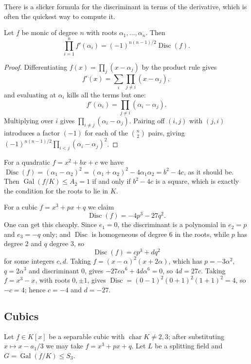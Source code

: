 \documentclass[a4paper]{scrartcl}
\newcommand{\charr}{\operatorname{char}}
\newcommand{\Gal}{\operatorname{Gal}}
\newcommand{\Disc}{\operatorname{Disc}}
\begin{document}
There is a slicker formula for the discriminant in terms of the derivative, which is often the quickest way to compute it.

\begin{proposition}\label{prop:discderiv}
	Let $f$ be monic of degree $n$ with roots $\alpha_1,\dots,\alpha_n$. Then
	$$\prod_{i=1}^n f'(\alpha_i) = (-1)^{n(n-1)/2}\Disc(f).$$
\end{proposition}

\begin{proof}
	Differentiating $f(x) = \prod_j (x-\alpha_j)$ by the product rule gives
	$$f'(x) = \sum_i \prod_{j\neq i}(x-\alpha_j),$$
	and evaluating at $\alpha_i$ kills all the terms but one:
	$$f'(\alpha_i) = \prod_{j \neq i}(\alpha_i - \alpha_j).$$
	Multiplying over $i$ gives $\prod_{i\neq j}(\alpha_i-\alpha_j)$. Pairing off $(i,j)$ with $(j,i)$ introduces a factor $(-1)$ for each of the $\binom{n}{2}$ pairs, giving $(-1)^{n(n-1)/2}\prod_{i<j}(\alpha_i-\alpha_j)^2$.
\end{proof}

\begin{example}
	For a quadratic $f = x^2+bx+c$ we have $\Disc(f) = (\alpha_1-\alpha_2)^2 = (\alpha_1+\alpha_2)^2 - 4\alpha_1\alpha_2 = b^2-4c$, as it should be. Then $\Gal(f/K) \leq A_2 = 1$ if and only if $b^2-4c$ is a square, which is exactly the condition for the roots to lie in $K$.
\end{example}

\begin{example}\label{ex:disccubic}
	For a cubic $f = x^3 + px + q$ we claim
	$$\Disc(f) = -4p^3 - 27q^2.$$
	One can get this cheaply. Since $e_1 = 0$, the discriminant is a polynomial in $e_2 = p$ and $e_3 = -q$ only; and $\Disc$ is homogeneous of degree $6$ in the roots, while $p$ has degree $2$ and $q$ degree $3$, so
	$$\Disc(f) = cp^3 + dq^2$$
	for some integers $c,d$. Taking $f = (x-\alpha)^2(x+2\alpha)$, which has $p = -3\alpha^2$, $q = 2\alpha^3$ and discriminant $0$, gives $-27c\alpha^6 + 4d\alpha^6 = 0$, so $4d = 27c$. Taking $f = x^3 - x$, with roots $0, \pm1$, gives $\Disc = (0-1)^2(0+1)^2(1+1)^2 = 4$, so $-c = 4$; hence $c = -4$ and $d = -27$.
\end{example}

\subsection{Cubics}

Let $f \in K[x]$ be a separable cubic with $\charr K \neq 2, 3$; after substituting $x \mapsto x - a_1/3$ we may take $f = x^3+px+q$. Let $L$ be a splitting field and $G = \Gal(f/K) \leq S_3$.
\end{document}
